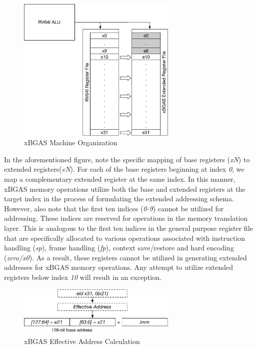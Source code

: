\documentclass{article}
\begin{document}
\begin{figure}[h!]
\begin{center}
\includegraphics[width=3in]{figures/rv128imachorg.pdf}
\caption{xBGAS Machine Organization}
\label{fig:machineorganization}
\end{center}
\end{figure}

In the aforementioned figure, note the specific mapping of base registers 
(\textit{xN}) to extended registers(\textit{eN}).  For each of the base 
registers beginning at index \textit{0}, we map a complementary extended 
register at the same index.  In this manner, xBGAS memory operations 
utilize both the base and extended registers at the target index in the process 
of formulating the extended addressing schema.  However, also note that 
the first ten indices (\textit{0-9}) cannot be utilized for addressing.  These 
indices are reserved for operations in the memory translation layer.  This is 
analogous to the first ten indices in the general purpose register file 
that are specifically allocated to various operations associated with instruction 
handling (\textit{sp}), frame handling (\textit{fp}), context save/restore 
and hard encoding (\textit{zero/x0}).  As a result, these registers cannot be 
utilized in generating extended addresses for xBGAS memory operations.  
Any attempt to utilize extended registers below index \textit{10} will 
result in an exception.    

\begin{figure}[h!]
\begin{center}
\includegraphics[width=3in]{figures/effectiveaddress.pdf}
\caption{xBGAS Effective Address Calculation}
\label{fig:effectiveaddr}
\end{center}
\end{figure}
\end{document}
